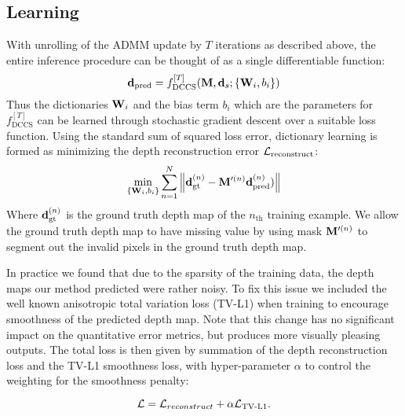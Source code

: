 \subsection{Learning}
\label{sec:dictionary-learning}

With unrolling of the ADMM update by $T$ iterations as described above, the entire inference procedure can be thought of as a single differentiable function:
\begin{equation}
    \mathbf{d}_\text{pred} = f_\text{DCCS}^{[T]}(\mathbf{M}, \mathbf{d}_s; \{\mathbf{W}_i, b_i\})
\end{equation}
Thus the dictionaries $\mathbf{W}_i$ and the bias term $b_i$ which are the parameters for $f_\text{DCCS}^{[T]}$ can be learned through  stochastic gradient descent over a suitable loss function. Using the standard sum of squared loss error, dictionary learning is formed as minimizing the depth reconstruction error $\mathcal{L}_\text{reconstruct}$:
\begin{equation}
  \label{eq:9}
  \min_{\{\mathbf{W}_i, b_i\}} \sum_{n=1}^{N}\left\Vert \mathbf{d}_\text{gt}^{(n)} - \mathbf{M}'^{(n)}  \mathbf{d}_\text{pred}^{(n)})\right\Vert
\end{equation}
Where $\mathbf{d}_\text{gt}^{(n)}$ is the ground truth depth map of the $n_\text{th}$ training example. We allow the ground truth depth map to have missing value by using mask $\mathbf{M}'^{(n)}$ to segment out the invalid pixels in the ground truth depth map. 

In practice we found that due to the sparsity of the training data, the depth maps our method predicted were rather noisy. To fix this issue we included the well known anisotropic total variation loss (TV-L1) when training to encourage smoothness of the predicted depth map. Note that this change has no significant impact on the quantitative error metrics, but produces more visually pleasing outputs. The total loss is then given by summation of the depth reconstruction loss and the TV-L1 smoothness loss, with hyper-parameter $\alpha$ to control the weighting for the smoothness penalty:

\begin{equation}
  \label{eq:9}
  \mathcal{L} = \mathcal{L}_{reconstruct} + \alpha \mathcal{L}_\text{TV-L1}.
\end{equation}

